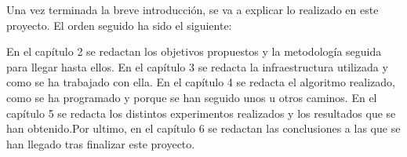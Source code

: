 
\hspace{1 cm} Una vez terminada la breve introducci\'on, se va a explicar lo realizado en este proyecto. El orden seguido ha sido el siguiente:

\hspace{1 cm} En el cap\'itulo 2 se redactan los objetivos propuestos y la metodolog\'ia seguida para llegar hasta ellos. En el cap\'itulo 3 se redacta la infraestructura utilizada y como se ha trabajado con ella. En el cap\'itulo 4 se redacta el algoritmo realizado, como se ha programado y porque se han seguido unos u otros caminos. En el cap\'itulo 5 se redacta los distintos experimentos realizados y los resultados que se han obtenido.Por ultimo, en el cap\'itulo 6 se redactan las conclusiones a las que se han llegado tras finalizar este proyecto.









